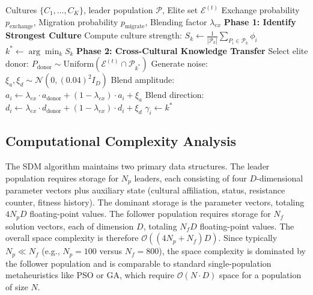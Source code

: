 \documentclass[11pt]{article}
\begin{document}
\begin{algorithm}[h]
\caption{Sociocultural Exchange Mechanism}
\label{alg:exchange}
\begin{algorithmic}[1]
\Require Cultures $\{C_1, \ldots, C_K\}$, leader population $\mathcal{P}$, Elite set $\mathcal{E}^{(t)}$
\Require Exchange probability $p_{\text{exchange}}$, Migration probability $p_{\text{migrate}}$, Blending factor $\lambda_{ex}$
\State \textbf{Phase 1: Identify Strongest Culture}
    \State Compute culture strength: $S_k \leftarrow \frac{1}{|\mathcal{P}_k|} \sum_{P_i \in \mathcal{P}_k} \phi_i$
\EndFor
\State $k^* \leftarrow \arg\min_k S_k$ 
\State \textbf{Phase 2: Cross-Cultural Knowledge Transfer}
         
            \State Select elite donor: $P_{\text{donor}} \sim \text{Uniform}(\mathcal{E}^{(t)} \cap \mathcal{P}_{k^*})$
            \State Generate noise: $\xi_a, \xi_d \sim \mathcal{N}(0, (0.04)^2 I_D)$
            \State Blend amplitude: $a_i \leftarrow \lambda_{ex} \cdot a_{\text{donor}} + (1-\lambda_{ex}) \cdot a_i + \xi_a$
            \State Blend direction: $d_i \leftarrow \lambda_{ex} \cdot d_{\text{donor}} + (1-\lambda_{ex}) \cdot d_i + \xi_d$
             
                \State $\gamma_i \leftarrow k^*$ 
            \EndIf
        \EndIf
    \EndFor
\EndFor
\end{algorithmic}
\end{algorithm}



\subsection{Computational Complexity Analysis\label{sec:complexity}}


The SDM algorithm maintains two primary data structures. The leader population requires storage for $N_p$ leaders, each consisting of four $D$-dimensional parameter vectors plus auxiliary state (cultural affiliation, status, resistance counter, fitness history). The dominant storage is the parameter vectors, totaling $4N_p D$ floating-point values. The follower population requires storage for $N_f$ solution vectors, each of dimension $D$, totaling $N_f D$ floating-point values. The overall space complexity is therefore $\mathcal{O}((4N_p + N_f)D)$. Since typically $N_p \ll N_f$ (e.g., $N_p = 100$ versus $N_f = 800$), the space complexity is dominated by the follower population and is comparable to standard single-population metaheuristics like PSO or GA, which require $\mathcal{O}(N \cdot D)$ space for a population of size $N$.
\end{document}
